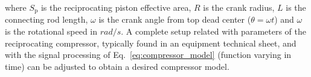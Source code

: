 \documentclass[12pt]{article}
\begin{document}
\noindent where $S_\text{p}$ is the reciprocating piston effective area, $R$ is the crank radius, $L$ is the connecting rod length, $\omega$ is the crank angle from top dead center ($\theta = \omega t$) and $\omega$ is the rotational speed in $rad/s$. A complete setup related with parameters of the reciprocating compressor, typically found in an equipment technical sheet, and with the signal processing of Eq.~\ref{eq:compressor_model} (function varying in time) can be adjusted to obtain a desired compressor model.



% 
\newpage
% 


\end{document}
